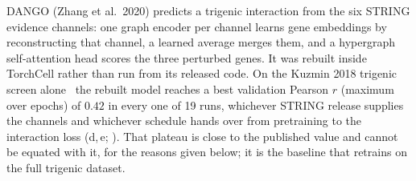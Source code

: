 \clearpage
{}

DANGO (Zhang et al.\ 2020) predicts a trigenic interaction from the six STRING evidence
channels: one graph encoder per channel learns gene embeddings by reconstructing that
channel, a learned average merges them, and a hypergraph self-attention head scores the three
perturbed genes. It was rebuilt inside TorchCell rather than run from its released code. On
the Kuzmin 2018 trigenic screen alone~\cite{kuzminSystematicAnalysisComplex2018a} the
rebuilt model reaches a best validation Pearson $r$ (maximum over epochs) of $0.42$ in every
one of 19 runs, whichever STRING release supplies the channels and whichever schedule hands
over from pretraining to the interaction loss (d,\,e;
). That plateau is close to the published value and cannot
be equated with it, for the reasons given below; it is the baseline that
 retrains on the full trigenic dataset.


